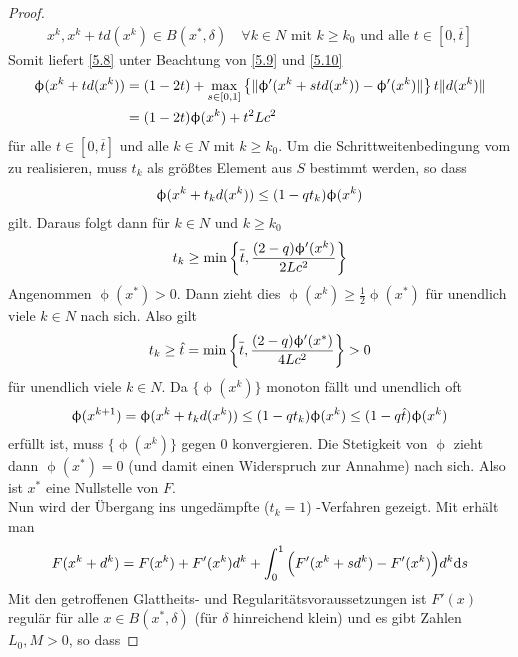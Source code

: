 \begin{proof}
	\begin{align}
		\label{5.11}
		x^k, x^k+td(x^k)\in B(x^\ast,\delta)\quad\forall k\in N\text{ mit } k\ge k_0\text{ und alle } t\in [0,\overline{t}] 
	\end{align}
	Somit liefert \cref{5.8} unter Beachtung von \cref{5.9} und \cref{5.10}
	\begin{align}
		\upphi(x^k+td(x^k)) &= (1-2t) + \max\limits_{s\in [0,1]}\left\lbrace \Vert \upphi'(x^k+std(x^k)) - \upphi'(x^k)\Vert \right\rbrace t\Vert d(x^k)\Vert \notag\\
		&= (1-2t)\upphi(x^k) + t^2Lc^2 \notag
	\end{align}
	für alle $t\in [0,\overline{t}]$ und alle $k\in N$ mit $k\ge k_0$. Um die Schrittweitenbedingung vom  zu realisieren, muss $t_k$ als größtes Element aus $S$ bestimmt werden, so dass
	\begin{align}
		\upphi(x^k + t_kd(x^k)) \le (1-qt_k)\upphi(x^k)\notag
	\end{align}
	gilt. Daraus folgt dann für $k\in N$ und $k\ge k_0$
	\begin{align}
		t_k\ge \min\left\lbrace \overline{t},\frac{(2-q)\upphi'(x^k)}{2Lc^2}\right\rbrace \notag
	\end{align}
	Angenommen $\upphi(x^\ast)>0$. Dann zieht dies $\upphi(x^k)\ge \frac{1}{2}\upphi(x^\ast)$ für unendlich viele $k\in N$ nach sich. Also gilt
	\begin{align}
		t_k\ge \hat{t} = \min\left\lbrace \overline{t},\frac{(2-q)\upphi'(x^\ast)}{4Lc^2}\right\rbrace >0\notag
	\end{align}
	für unendlich viele $k\in N$. Da $\{\upphi(x^k)\}$ monoton fällt und unendlich oft
	\begin{align}
		\upphi(x^{k+1}) = \upphi(x^k+t_kd(x^k)) \le (1-qt_k)\upphi(x^k) \le (1-q\hat{t})\upphi(x^k)\notag
	\end{align}
	erfüllt ist, muss $\{\upphi(x^k)\}$ gegen 0 konvergieren. Die Stetigkeit von $\upphi$ zieht dann $\upphi(x^\ast)=0$ (und damit einen Widerspruch zur Annahme) nach sich. Also ist $x^\ast$ eine Nullstelle von $F$. \\
	Nun wird der Übergang ins ungedämpfte ($t_k=1$) -Verfahren gezeigt. Mit  erhält man
	\begin{align}
		\label{5.12}
		F(x^k+d^k) = F(x^k) + F'(x^k)d^k + \int_0^1 \Big(F'(x^k+sd^k) - F'(x^k)\Big)d^k\mathrm{d} s
	\end{align}
	Mit den getroffenen Glattheits- und Regularitätsvoraussetzungen ist $F'(x)$ regulär für alle $x\in B(x^\ast,\delta)$ (für $\delta$ hinreichend klein) und es gibt Zahlen $L_0,M>0$, so dass

\end{proof}
